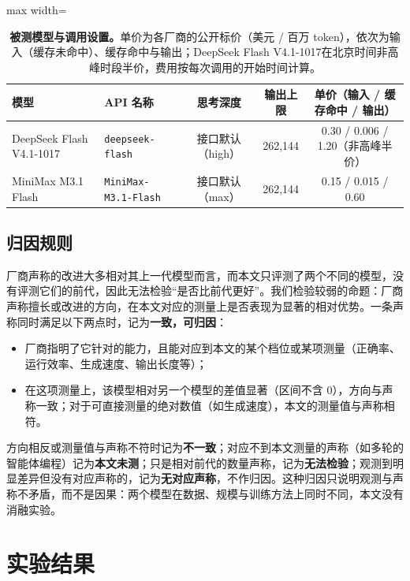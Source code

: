 \documentclass[11pt,a4paper,fontset=none]{ctexart}
\newcommand{\ds}{DeepSeek Flash V4.1-1017}
\newcommand{\mini}{MiniMax M3.1 Flash}
\begin{document}
\begin{table}[!tbp]
  \centering
  \caption{\textbf{被测模型与调用设置。}单价为各厂商的公开标价（美元 / 百万 token），依次为输入（缓存未命中）、缓存命中与输出；\ds 在北京时间非高峰时段半价，费用按每次调用的开始时间计算。}
  \label{tab:models}
  \small
  \begin{adjustbox}{max width=\linewidth}
  \begin{tabular}{llccc}
    \toprule
    模型 & API 名称 & 思考深度 & 输出上限 & 单价（输入 / 缓存命中 / 输出） \\
    \midrule
    \ds & \texttt{deepseek-flash} & 接口默认（high） & 262,144 & 0.30 / 0.006 / 1.20（非高峰半价） \\
    \mini & \texttt{MiniMax-M3.1-Flash} & 接口默认（max） & 262,144 & 0.15 / 0.015 / 0.60 \\
    \bottomrule
  \end{tabular}
  \end{adjustbox}
\end{table}

\subsection{归因规则}
\label{sec:attr-rule}

厂商声称的改进大多相对其上一代模型而言，而本文只评测了两个不同的模型，没有评测它们的前代，因此无法检验“是否比前代更好”。我们检验较弱的命题：厂商声称擅长或改进的方向，在本文对应的测量上是否表现为显著的相对优势。一条声称同时满足以下两点时，记为\textbf{一致，可归因}：
\begin{itemize}[leftmargin=1.6em]
  \item 厂商指明了它针对的能力，且能对应到本文的某个档位或某项测量（正确率、运行效率、生成速度、输出长度等）；
  \item 在这项测量上，该模型相对另一个模型的差值显著（区间不含 0），方向与声称一致；对于可直接测量的绝对数值（如生成速度），本文的测量值与声称相符。
\end{itemize}
方向相反或测量值与声称不符时记为\textbf{不一致}；对应不到本文测量的声称（如多轮的智能体编程）记为\textbf{本文未测}；只是相对前代的数量声称，记为\textbf{无法检验}；观测到明显差异但没有对应声称的，记为\textbf{无对应声称}，不作归因。这种归因只说明观测与声称不矛盾，而不是因果：两个模型在数据、规模与训练方法上同时不同，本文没有消融实验。

\section{实验结果}
\end{document}
